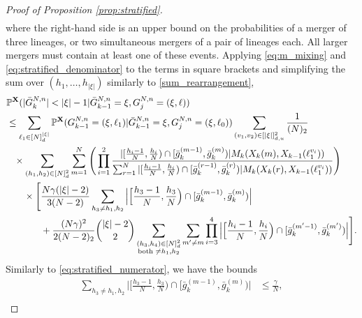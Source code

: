 \documentclass[10pt,a4paper]{amsart}
\newcommand{\bbP}{\mathbb{P}}
\newcommand{\bfX}{\mathbf{X}}
\begin{document}
\begin{proof}[Proof of Proposition \ref{prop:stratified}]
\begin{align*}
\end{align*}
where the right-hand side is an upper bound on the probabilities of a merger of three lineages, or two simultaneous mergers of a pair of lineages each.
All larger mergers must contain at least one of these events.
Applying \eqref{eq:m_mixing} and \eqref{eq:stratified_denominator} to the terms in square brackets and simplifying the sum over $( h_1, \ldots, h_{ | \xi | } )$ similarly to \eqref{sum_rearrangement}, 
\begin{align}
&\bbP^{ \bfX }( | \bar{ G }_k^{ N, n } | < | \xi | - 1 | \bar{ G }_{ k - 1 }^{ N, n } = \xi, G_j^{ N, n } = ( \xi, \ell ) ) \notag \\
&\leq \sum_{ \ell_1 \in [ N ]_d^{ | \xi | } } \bbP^{ \bfX }( G_{ k - 1 }^{ N, n } = ( \xi, \ell_1 ) | \bar{ G }_{ k - 1 }^{ N, n } = \xi, G_j^{ N, n } = ( \xi, \ell_0 ) ) \sum_{ ( v_1, v_2 ) \in [ | \xi | ]_{ d, u }^2 } \frac{ 1 }{ ( N )_2 } \notag \\
&\phantom{\leq} \times \sum_{ ( h_1, h_2 ) \in [ N ]_d^2 } \sum_{ m = 1 }^N \Bigg( \prod_{ i = 1 }^2 \frac{ | [ \frac{ h_i - 1 }{ N }, \frac{ h_i }{ N } ) \cap [ \bar{ g }_k^{ ( m - 1 ) }, \bar{ g }_k^{ ( m ) } ) | M_k( X_k( m ), X_{ k - 1 }( \ell_1^{ v_i } ) ) }{ \sum_{ r = 1 }^N | [ \frac{ h_i - 1 }{ N }, \frac{ h_i }{ N } ) \cap [ \bar{ g }_k^{ ( r - 1 ) }, \bar{ g }_k^{ ( r ) } ) | M_k( X_k( r ), X_{ k - 1 }( \ell_1^{ v_i } ) ) } \Bigg) \notag \\
&\phantom{\leq \times } \times \Bigg[ \frac{ N \gamma  ( | \xi | - 2 ) }{ 3 ( N - 2 ) } \sum_{ h_3 \neq h_1, h_2 } \Big| \Big[ \frac{ h_3 - 1 }{ N }, \frac{ h_3 }{ N } \Big) \cap [ \bar{ g }_k^{ ( m - 1 ) }, \bar{ g }_k^{ ( m ) } ) \Big| \notag \\
&\phantom{\leq \times \times \Bigg[} + \frac{ ( N \gamma )^2 }{ 2 ( N - 2 )_2 } \binom{ | \xi | - 2 }{ 2 }  \sum_{ \substack{ ( h_3, h_4 ) \in [ N ]_d^2 \\ \text{both } \neq h_1, h_2 } } \sum_{ m' \neq m } \prod_{ i = 3 }^4 \Big| \Big[ \frac{ h_i - 1 }{ N }, \frac{ h_i }{ N } \Big) \cap [ \bar{ g }_k^{ ( m' - 1 ) }, \bar{ g }_k^{ ( m' ) } ) \Big| \Bigg]. \label{eq:stratified_multiple_merger_bound}
\end{align}
Similarly to \eqref{eq:stratified_numerator}, we have the bounds
\begin{align*}
\sum_{ h_3 \neq h_1, h_2 } \Big| \Big[ \frac{ h_3 - 1 }{ N }, \frac{ h_3 }{ N } \Big) \cap [ \bar{ g }_k^{ ( m - 1 ) }, \bar{ g }_k^{ ( m ) } ) \Big| &\leq\frac{ \gamma }{ N }, \\

\end{align*}
\end{proof}
\end{document}
